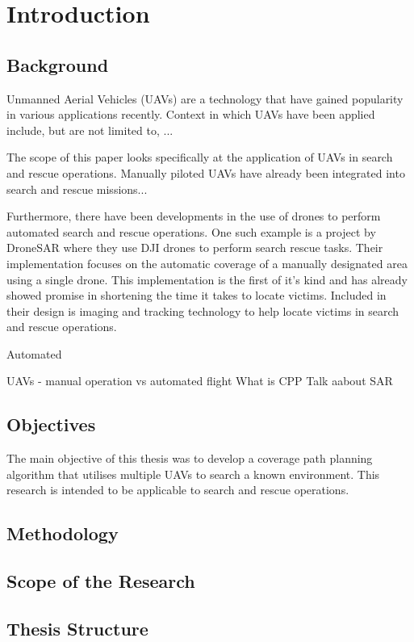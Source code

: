 \chapter{Introduction}
\label{chp:intro}


\section{Background}

Unmanned Aerial Vehicles (UAVs) are a technology that have gained popularity in various applications recently\cite{CPP-Survey-2019}. Context in which UAVs have been applied include, but are not limited to, ...

The scope of this paper looks specifically at the application of UAVs in search and rescue operations. Manually piloted UAVs have already been integrated into search and rescue missions... 

Furthermore, there have been developments in the use of drones to perform automated search and rescue operations. One such example is a project by DroneSAR where they use DJI drones to perform search rescue tasks. Their implementation focuses on the automatic coverage of a manually designated area using a single drone. This implementation is the first of it's kind and has already showed promise in shortening the time it takes to locate victims. Included in their design is imaging and tracking technology to help locate victims in search and rescue operations.




Automated 

UAVs - manual operation vs automated flight
What is CPP
Talk aabout SAR


\section{Objectives}

The main objective of this thesis was to develop a coverage path planning algorithm that utilises multiple UAVs to search a known environment. This research is intended to be applicable to search and rescue operations.\linebreak
\cite{CPP-Survey-2019}


\section{Methodology}

\section{Scope of the Research}

\section{Thesis Structure}
